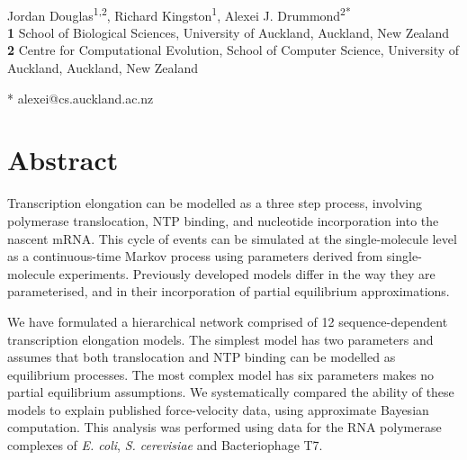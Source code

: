 \documentclass[10pt,letterpaper]{article}
\begin{document}
\vspace*{0.2in}

\begin{flushleft}
{\Large
\textbf{} %
}
\newline
\\
Jordan Douglas\textsuperscript{1,2},
Richard Kingston\textsuperscript{1},
Alexei J. Drummond\textsuperscript{2*}
\\
\bigskip
\textbf{1} School of Biological Sciences, University of Auckland, Auckland, New Zealand
\\
\textbf{2} Centre for Computational Evolution, School of Computer Science, University of Auckland, Auckland, New Zealand
\\
\bigskip


* alexei@cs.auckland.ac.nz


\end{flushleft}
\section*{Abstract}

Transcription elongation can be modelled as a three step process, involving polymerase translocation, NTP binding, and nucleotide incorporation into the nascent mRNA. This cycle of events can be simulated at the single-molecule level as a continuous-time Markov process using parameters derived from single-molecule experiments. Previously developed models differ in the way they are parameterised, and in their incorporation of partial equilibrium approximations.

We have formulated a hierarchical network comprised of 12 sequence-dependent transcription elongation models. The simplest model has two parameters and assumes that both translocation and NTP binding can be modelled as equilibrium processes. The most complex model has six parameters makes no partial equilibrium assumptions. We systematically compared the ability of these models to explain published force-velocity data, using approximate Bayesian computation. This analysis was performed using data for the RNA polymerase complexes of \textit{ E. coli}, \textit{ S. cerevisiae} and Bacteriophage T7.
\end{document}
